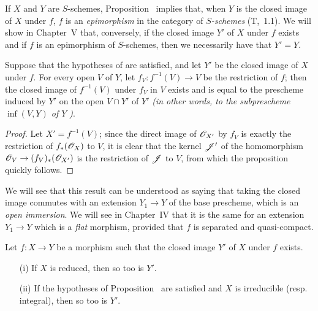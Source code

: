 \begin{remark}[9.5.7]
\label{I.9.5.7}
If $X$ and $Y$ are $S$-schemes, Proposition~ implies that, when
$Y$ is the closed image of $X$ under $f$, $f$ is an \emph{epimorphism} in the category of \emph{$S$-schemes} (T,~1.1).
We will show in Chapter~V that, conversely, if the closed image $Y'$ of $X$ under $f$ exists and if $f$ is an epimorphism of $S$-schemes, then we necessarily have that $Y'=Y$.
\end{remark}

\begin{proposition}[9.5.8]
\label{I.9.5.8}
Suppose that the hypotheses of  are satisfied, and let $Y'$ be the closed image of $X$ under $f$.
For every open $V$ of $Y$, let $f_V:f^{-1}(V)\to V$ be the restriction of $f$; then the closed image of $f^{-1}(V)$ under $f_V$ in $V$ exists and is equal to the prescheme induced by $Y'$ on the open $V\cap Y'$ of $Y'$ \emph{(in other words, to the subprescheme $\inf(V,Y)$ of $Y$ )}.
\end{proposition}

\begin{proof}
Let $X'=f^{-1}(V)$; since the direct image of $\mathscr{O}_{X'}$ by $f_V$ is exactly the restriction of $f_*(\mathscr{O}_X)$ to $V$, it is clear that the kernel $\mathscr{J}'$ of the homomorphism $\sh{O}_V\to(f_V)_*(\sh{O}_{X'})$ is the restriction of $\mathscr{J}$ to $V$, from which the proposition quickly follows.
\end{proof}

We will see that this result can be understood as saying that taking the closed image commutes with an extension $Y_1\to Y$ of the base prescheme, which is an \emph{open immersion}.
We will see in Chapter~IV that it is the same for an extension $Y_1\to Y$ which is a \emph{flat} morphism, provided that $f$ is separated and quasi-compact.

\begin{proposition}[9.5.9]
\label{I.9.5.9}
Let $f:X\to Y$ be a morphism such that the closed image $Y'$ of $X$ under $f$ exists.
\begin{enumerate}
  \item[{\rm(i)}] If $X$ is reduced, then so too is $Y'$.
  \item[{\rm(ii)}] If the hypotheses of Proposition~ are satisfied and $X$ is irreducible (resp. integral), then so too is $Y'$.
\end{enumerate}
\end{proposition}


